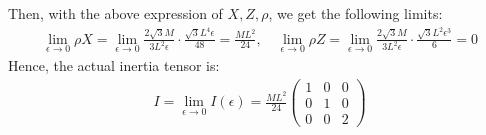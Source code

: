 \documentclass{article}
\begin{document}
Then, with the above expression of $X,Z,\rho$, we get the following limits:
\begin{align}
    \lim_{\epsilon\rightarrow 0}\rho X = \lim_{\epsilon\rightarrow 0}\frac{2\sqrt{3}M}{3L^2\epsilon}\cdot\frac{\sqrt{3}L^4\epsilon}{48} = \frac{ML^2}{24}, \quad \lim_{\epsilon\rightarrow 0}\rho Z = \lim_{\epsilon\rightarrow 0}\frac{2\sqrt{3}M}{3L^2\epsilon}\cdot\frac{\sqrt{3}L^2\epsilon^3}{6}=0
\end{align}
Hence, the actual inertia tensor is:
\begin{align}
    I = \lim_{\epsilon\rightarrow 0}I(\epsilon) = \frac{ML^2}{24}\begin{pmatrix}
        1&0&0\\0&1&0\\0&0&2
    \end{pmatrix}
\end{align}
\end{document}

